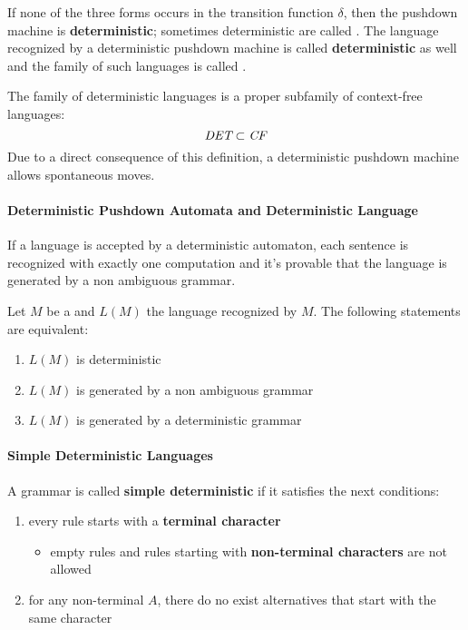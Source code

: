 \documentclass[english]{article}
\begin{document}
If none of the three forms occurs in the transition function \(\delta\), then the pushdown machine is \textbf{deterministic};
sometimes deterministic \PDA are called \DPDA.
The language recognized by a deterministic pushdown machine is called \textbf{deterministic} as well and the family of such languages is called \DET.

The family of deterministic languages is a proper subfamily of context-free languages:
\[ \textit{DET} \subset \textit{CF} \]
Due to a direct consequence of this definition, a deterministic pushdown machine allows spontaneous moves.

\paragraph{Deterministic Pushdown Automata and Deterministic Language}

If a language is accepted by a deterministic automaton, each sentence is recognized with exactly one computation and it's provable that the language is generated by a non ambiguous grammar.

\begin{property}
  Let \(M\) be a \DPDA and \(L(M)\) the language recognized by \(M\).
  The following statements are equivalent:

  \begin{enumerate}
    \item \(L(M)\) is deterministic
    \item \(L(M)\) is generated by a non ambiguous grammar
    \item \(L(M)\) is generated by a deterministic grammar
  \end{enumerate}
\end{property}

\paragraph{Simple Deterministic Languages}

A grammar is called \textbf{simple deterministic} if it satisfies the next conditions:

\begin{enumerate}
  \item every rule \RP starts with a \textbf{terminal character}
        \begin{itemize}
          \item empty rules and rules starting with \textbf{non-terminal characters} are not allowed
        \end{itemize}
  \item for any non-terminal \(A\), there do no exist alternatives that start with the same character
\end{enumerate}
\end{document}
